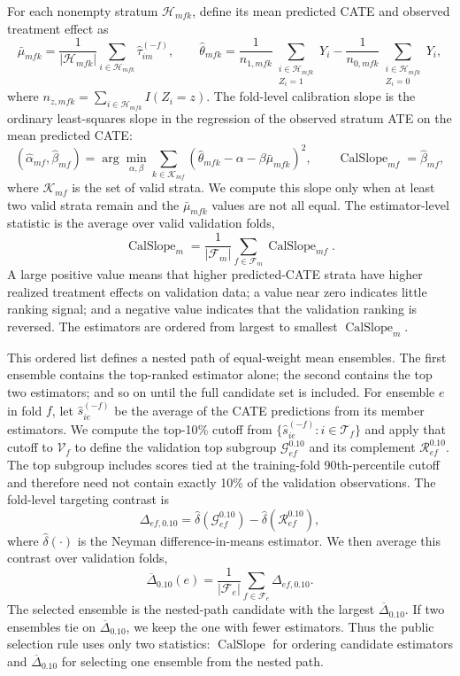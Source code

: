 \documentclass[12pt]{article}
\newcommand{\TargetFrac}{10{\%}\xspace}
\newcommand{\CalSlope}{\ensuremath{\operatorname{CalSlope}}}
\newcommand{\MeanDeltaTopTen}{\ensuremath{\overline{\Delta}_{0.10}}}
\begin{document}
For each nonempty stratum $\mathcal{H}_{mfk}$, define its mean predicted CATE and observed treatment effect as
\[
\bar{\mu}_{mfk}
= \frac{1}{|\mathcal{H}_{mfk}|}
\sum_{i\in\mathcal{H}_{mfk}}\widehat{\tau}_{im}^{(-f)},
\qquad
\widehat{\theta}_{mfk}
=
\frac{1}{n_{1,mfk}}\sum_{\substack{i\in\mathcal{H}_{mfk}\\ Z_i=1}}Y_i
-
\frac{1}{n_{0,mfk}}\sum_{\substack{i\in\mathcal{H}_{mfk}\\ Z_i=0}}Y_i ,
\]
where $n_{z,mfk}=\sum_{i\in\mathcal{H}_{mfk}}I(Z_i=z)$. The fold-level calibration slope is the ordinary least-squares slope in the regression of the observed stratum ATE on the mean predicted CATE:
\[
(\widehat{\alpha}_{mf},\widehat{\beta}_{mf})
=
\arg\min_{\alpha,\beta}
\sum_{k\in\mathcal{K}_{mf}}
\left(\widehat{\theta}_{mfk}-\alpha-\beta\bar{\mu}_{mfk}\right)^2,
\qquad
\CalSlope_{mf}=\widehat{\beta}_{mf},
\]
where $\mathcal{K}_{mf}$ is the set of valid strata. We compute this slope only when at least two valid strata remain and the $\bar{\mu}_{mfk}$ values are not all equal. The estimator-level statistic is the average over valid validation folds,
\[
\CalSlope_m
=
\frac{1}{|\mathcal{F}_m|}
\sum_{f\in\mathcal{F}_m}\CalSlope_{mf}.
\]
A large positive value means that higher predicted-CATE strata have higher realized treatment effects on validation data; a value near zero indicates little ranking signal; and a negative value indicates that the validation ranking is reversed. The estimators are ordered from largest to smallest $\CalSlope_m$.

This ordered list defines a nested path of equal-weight mean ensembles. The first ensemble contains the top-ranked estimator alone; the second contains the top two estimators; and so on until the full candidate set is included. For ensemble $e$ in fold $f$, let $\widehat{s}_{ie}^{(-f)}$ be the average of the CATE predictions from its member estimators. We compute the top-\TargetFrac cutoff from $\{\widehat{s}_{ie}^{(-f)}:i\in\mathcal{T}_f\}$ and apply that cutoff to $\mathcal{V}_f$ to define the validation top subgroup $\mathcal{G}_{ef}^{0.10}$ and its complement $\mathcal{R}_{ef}^{0.10}$. The top subgroup includes scores tied at the training-fold 90th-percentile cutoff and therefore need not contain exactly 10{\%} of the validation observations. The fold-level targeting contrast is
\[
\Delta_{ef,0.10}
=
\widehat{\delta}\!\left(\mathcal{G}_{ef}^{0.10}\right)
-
\widehat{\delta}\!\left(\mathcal{R}_{ef}^{0.10}\right),
\]
where $\widehat{\delta}(\cdot)$ is the Neyman difference-in-means estimator. We then average this contrast over validation folds,
\[
\MeanDeltaTopTen(e)
=
\frac{1}{|\mathcal{F}_e|}
\sum_{f\in\mathcal{F}_e}\Delta_{ef,0.10}.
\]
The selected ensemble is the nested-path candidate with the largest $\MeanDeltaTopTen$. If two ensembles tie on $\MeanDeltaTopTen$, we keep the one with fewer estimators. Thus the public selection rule uses only two statistics: $\CalSlope$ for ordering candidate estimators and $\MeanDeltaTopTen$ for selecting one ensemble from the nested path.
\end{document}
